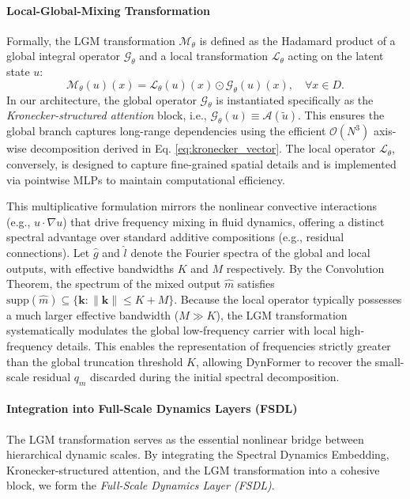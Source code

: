 \documentclass[final,3p,times]{elsarticle}
\begin{document}
\paragraph{Local-Global-Mixing Transformation}
Formally, the LGM transformation $\mathscr{M}_\theta$ is defined as the Hadamard product of a global integral operator $\mathscr{G}_\theta$ and a local transformation $\mathscr{L}_\theta$ acting on the latent state $u$:
\begin{equation}
\mathscr{M}_\theta(u)(x) = \mathscr{L}_\theta(u)(x) \odot \mathscr{G}_\theta(u)(x), \quad \forall x \in D.
\label{eq:lgm_definition}
\end{equation}
In our architecture, the global operator $\mathscr{G}_\theta$ is instantiated specifically as the \textit{Kronecker-structured attention} block, i.e., $\mathscr{G}_\theta(u) \equiv \mathcal{A}(\tilde{u})$. This ensures the global branch captures long-range dependencies using the efficient $\mathcal{O}(N^3)$ axis-wise decomposition derived in Eq. \eqref{eq:kronecker_vector}. The local operator $\mathscr{L}_\theta$, conversely, is designed to capture fine-grained spatial details and is implemented via pointwise MLPs to maintain computational efficiency. 

This multiplicative formulation mirrors the nonlinear convective interactions (e.g., $u \cdot \nabla u$) that drive frequency mixing in fluid dynamics, offering a distinct spectral advantage over standard additive compositions (e.g., residual connections). Let $\hat{g}$ and $\hat{l}$ denote the Fourier spectra of the global and local outputs, with effective bandwidths $K$ and $M$ respectively. By the Convolution Theorem, the spectrum of the mixed output $\hat{m}$ satisfies $\text{supp}(\hat{m}) \subseteq \{\mathbf{k} : \|\mathbf{k}\| \leq K + M\}$. Because the local operator typically possesses a much larger effective bandwidth ($M \gg K$), the LGM transformation systematically modulates the global low-frequency carrier with local high-frequency details. This enables the representation of frequencies strictly greater than the global truncation threshold $K$, allowing DynFormer to recover the small-scale residual $q_m$ discarded during the initial spectral decomposition.

\paragraph{Integration into Full-Scale Dynamics Layers (FSDL)}
The LGM transformation serves as the essential nonlinear bridge between hierarchical dynamic scales. By integrating the Spectral Dynamics Embedding, Kronecker-structured attention, and the LGM transformation into a cohesive block, we form the \emph{Full-Scale Dynamics Layer (FSDL)}. 
\end{document}
